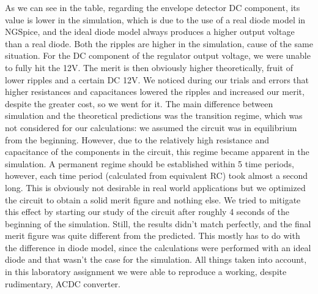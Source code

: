 As we can see in the table, regarding the envelope detector DC component, its value is lower in the simulation, which is due to the use of a real diode model in NGSpice, and the ideal diode model always produces a higher output voltage than a real diode. Both the ripples are higher in the simulation, cause of the same situation. For the DC component of the regulator output voltage, we were unable to fully hit the 12V. The merit is then obviously higher theoretically, fruit of lower ripples and a certain DC 12V. We noticed during our trials and errors that higher resistances and capacitances lowered the ripples and increased our merit, despite the greater cost, so we went for it.
The main difference between simulation and the theoretical predictions was the transition regime, which was not considered for our calculations: we assumed the circuit was in equilibrium from the beginning. However, due to the relatively high resistance and capacitance of the components in the circuit, this regime became apparent in the simulation. A permanent regime should be established within 5 time periods, however, each time period (calculated from equivalent RC) took almost a second long. This is obviously not desirable in real world applications but we optimized the circuit to obtain a solid merit figure and nothing else.
We tried to mitigate this effect by starting our study of the circuit after roughly 4 seconds of the beginning of the simulation. Still, the results didn't match perfectly, and the final merit figure was quite different from the predicted. This mostly has to do with the difference in diode model, since the calculations were performed with an ideal diode and that wasn't the case for the simulation.
All things taken into account, in this laboratory assignment we were able to reproduce a working, despite rudimentary, ACDC converter. 
